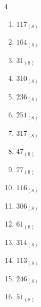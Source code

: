\begin{multicols}{4}
\begin{enumerate}
  \item $117_{(8)}$

        \phantom{$=79$}

  \item $164_{(8)}$

        \phantom{$=116$}

  \item $31_{(8)}$

        \phantom{$=25$}

  \item $310_{(8)}$

        \phantom{$=200$}

  \item $236_{(8)}$

        \phantom{$=158$}

  \item $251_{(8)}$

        \phantom{$=169$}

  \item $317_{(8)}$

        \phantom{$=207$}

  \item $47_{(8)}$

        \phantom{$=39$}

  \item $77_{(8)}$

        \phantom{$=63$}

\columnbreak %

  \item $116_{(8)}$

        \phantom{$=78$}

  \item $306_{(8)}$

        \phantom{$=198$}

  \item $61_{(8)}$

        \phantom{$=49$}

  \item $314_{(8)}$

        \phantom{$=204$}

  \item $113_{(8)}$

        \phantom{$=75$}

  \item $246_{(8)}$

        \phantom{$=166$}

  \item $51_{(8)}$


\end{enumerate}
\end{multicols}

